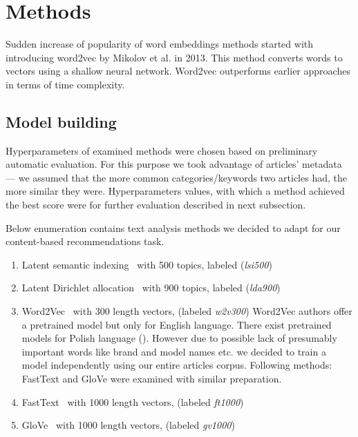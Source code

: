 \documentclass[twoside,twocolumn]{article}
\begin{document}
	\section{Methods}
	Sudden increase of popularity of word embeddings methods started with introducing word2vec by Mikolov et al. in 2013\cite{word2vec}. This method converts words to vectors using a shallow neural network. Word2vec outperforms earlier approaches in terms of time complexity.

	\subsection{Model building}
	
	Hyperparameters of examined methods were chosen based on preliminary automatic evaluation. For this purpose we took advantage of articles' metadata --- we assumed that the more common categories/keywords two articles had, the more similar they were. Hyperparameters values, with which a method achieved the best score were for further evaluation described in next subsection.
	
	Below enumeration contains text analysis methods we decided to adapt for our content-based recommendations task.
	\begin{enumerate}
		\item Latent semantic indexing~\cite{lsa} with 500 topics, labeled (\emph{lsi500})
		\item Latent Dirichlet allocation~\cite{lda} with 900 topics, labeled (\emph{lda900})
		\item Word2Vec~\cite{word2vec} with 300 length vectors, (labeled \emph{w2v300})  %
			Word2Vec authors offer a pretrained model but only for English language. There exist pretrained models for Polish language (\cite{pias}). However due to possible lack of presumably important words like brand and model names etc. we decided to train a model independently using our entire articles corpus. Following methods: FastText and GloVe were examined with similar preparation.
		\item FastText~\cite{fasttext} with 1000 length vectors, (labeled \emph{ft1000})
		\item GloVe~\cite{glove} with 1000 length vectors, (labeled \emph{gv1000})
	\end{enumerate}
	
\end{document}
